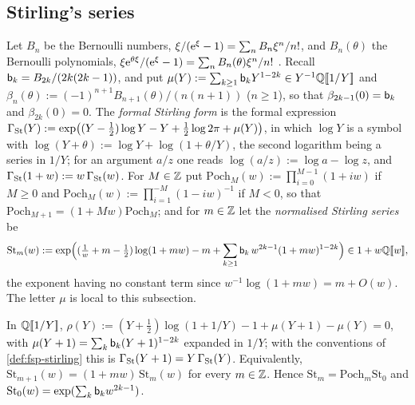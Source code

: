 
\subsection{Stirling's series}
\label{sec:fsp-stirling}

\begin{defn}
\label{def:fsp-stirling}
Let $B_n$ be the Bernoulli numbers, $\xi/(\mathrm{e}^\xi-1)=\sum_nB_n\xi^n/n!$, and $B_n(\theta)$ the Bernoulli polynomials, $\xi\mathrm{e}^{\theta\xi}/(\mathrm{e}^\xi-1)=\sum_nB_n(\theta)\xi^n/n!$ \cite[24.2.3]{DLMF}. Recall $\mathsf{b}_k=B_{2k}/(2k(2k-1))$, and put $\mu(Y):=\sum_{k\geq1}\mathsf{b}_kY^{1-2k}\in Y^{-1}\mathbb{Q}[\![ 1/Y ]\!]$ and $\beta_n(\theta):=(-1)^{n+1}B_{n+1}(\theta)/(n(n+1))$ ($n\geq1$), so that $\beta_{2k-1}(0)=\mathsf{b}_k$ and $\beta_{2k}(0)=0$. The \emph{formal Stirling form} is the formal expression $\Gamma_{\mathrm{St}}(Y):=\exp\bigl((Y-\frac12)\log Y-Y+\frac12\log2\pi+\mu(Y)\bigr)$, in which $\log Y$ is a symbol with $\log(Y+\theta):=\log Y+\log(1+\theta/Y)$, the second logarithm being a series in $1/Y$; for an argument $a/z$ one reads $\log(a/z):=\log a-\log z$, and $\Gamma_{\mathrm{St}}(1+w):=w\,\Gamma_{\mathrm{St}}(w)$. For $M\in\mathbb{Z}$ put $\mathrm{Poch}_M(w):=\prod_{i=0}^{M-1}(1+iw)$ if $M\geq0$ and $\mathrm{Poch}_M(w):=\prod_{i=1}^{-M}(1-iw)^{-1}$ if $M<0$, so that $\mathrm{Poch}_{M+1}=(1+Mw)\mathrm{Poch}_M$; and for $m\in\mathbb{Z}$ let the \emph{normalised Stirling series} be
\[
\mathrm{St}_m(w):=\exp\Bigl((\tfrac1w+m-\tfrac12)\log(1+mw)-m+\sum_{k\geq1}\mathsf{b}_k\,w^{2k-1}(1+mw)^{1-2k}\Bigr)\in1+w\mathbb{Q}[\![ w ]\!],
\]
the exponent having no constant term since $w^{-1}\log(1+mw)=m+O(w)$. The letter $\mu$ is local to this subsection.
\end{defn}

\begin{lem}
\label{lem:fsp-stirfe}
In $\mathbb{Q}[\![ 1/Y ]\!]$, $\rho(Y):=(Y+\frac12)\log(1+1/Y)-1+\mu(Y+1)-\mu(Y)=0$, with $\mu(Y+1)=\sum_k\mathsf{b}_k(Y+1)^{1-2k}$ expanded in $1/Y$; with the conventions of \cref{def:fsp-stirling} this is $\Gamma_{\mathrm{St}}(Y+1)=Y\,\Gamma_{\mathrm{St}}(Y)$. Equivalently, $\mathrm{St}_{m+1}(w)=(1+mw)\,\mathrm{St}_m(w)$ for every $m\in\mathbb{Z}$. Hence $\mathrm{St}_m=\mathrm{Poch}_m\mathrm{St}_0$ and $\mathrm{St}_0(w)=\exp(\sum_k\mathsf{b}_kw^{2k-1})$.
\end{lem}

